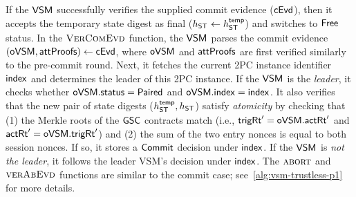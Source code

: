  If the $\mathsf{VSM}_{}$ successfully verifies the supplied commit evidence ($\mathsf{cEvd}$), then it accepts the temporary state digest as final ($h_{\mathsf{ST_{}}} \gets h_{\mathsf{ST_{}}}^{\mathsf{temp}}$) and switches to $\mathsf{Free}$ status.
 In the $\textproc{VerComEvd}$ function, the $\mathsf{VSM}_{}$ parses the commit evidence $(\mathsf{oVSM}, \mathsf{attProofs}) \gets \mathsf{cEvd}$, where $\mathsf{oVSM}$ and $\mathsf{attProofs}$ are first verified similarly to the pre-commit round. Next, it fetches the current 2PC instance identifier $\mathsf{index}$ and determines the leader of this 2PC instance. If the $\mathsf{VSM}_{}$ is the \textit{leader}, it checks whether $\mathsf{oVSM}.\mathsf{status} = \mathsf{Paired}$ and $\mathsf{oVSM}.\mathsf{index} = \mathsf{index}$. It also verifies that the new pair of state digests ($h_{\mathsf{ST_{}}}^{\mathsf{temp}}, h_{\mathsf{ST_{}}}$) satisfy \emph{atomicity} by checking that (1) the Merkle roots of the $\mathsf{GSC}$ contracts match (i.e., $\mathsf{trigRt}_{\mathsf{}}' = \mathsf{oVSM}.\mathsf{actRt}_{\mathsf{}}'$ and $\mathsf{actRt}_{\mathsf{}}' = \mathsf{oVSM}.\mathsf{trigRt}_{\mathsf{}}'$) and (2) the sum of the two entry nonces is equal to both session nonces. If so, it stores a $\mathsf{Commit}$ decision under $\mathsf{index}$. If the $\mathsf{VSM}_{}$ is \textit{not the leader}, it follows the leader VSM's decision under $\mathsf{index}$. The $\textproc{abort}$ and $\textproc{verAbEvd}$ functions are similar to the commit case; see~\cref{alg:vsm-trustless-p1} for more details.



